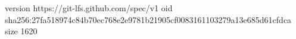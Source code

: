 version https://git-lfs.github.com/spec/v1
oid sha256:27fa518974c84b70ec768e2e9781b21905cf0083161103279a13e685d61cfdca
size 1620
